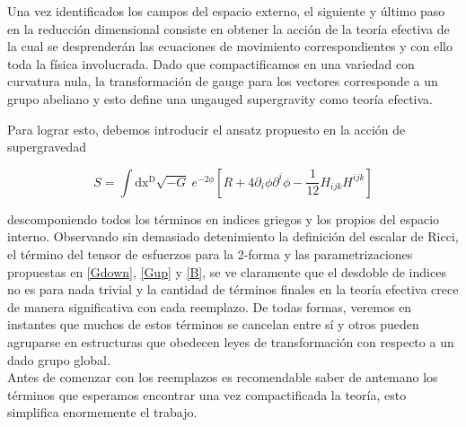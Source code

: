 \documentclass{article}
\numberwithin{equation}{section}
\begin{document}
Una vez identificados los campos del espacio externo, el siguiente y último paso en la reducción dimensional consiste en obtener la acción de la teoría efectiva de la cual se desprenderán las ecuaciones de movimiento correspondientes y con ello toda la física involucrada. Dado que compactificamos en una variedad con curvatura nula, la transformación de gauge para los vectores corresponde a un grupo abeliano y esto define una ungauged supergravity como teoría efectiva. 

Para lograr esto, debemos introducir el ansatz propuesto en la acción de supergravedad

\begin{equation}\label{S}
S=\int\mathrm{dx^D} \sqrt{-G} \ e^{-2\phi}\left[R + 4 \partial_i\phi\partial^i \phi - \frac{1}{12} H_{i j k}H^{i j k}\right]  
\end{equation}

descomponiendo todos los términos en indices griegos y los propios del espacio interno. Observando sin demasiado detenimiento la definición del escalar de Ricci, el término del tensor de esfuerzos para la 2-forma y las parametrizaciones propuestas en \ref{Gdown}, \ref{Gup} y \ref{B}, se ve claramente que el desdoble de indices no es para nada trivial y la cantidad de términos finales en la teoría efectiva crece de manera significativa con cada reemplazo. De todas formas, veremos en instantes que muchos de estos términos se cancelan entre sí y otros pueden agruparse en estructuras que obedecen leyes de transformación con respecto a un dado grupo global.\\ 
	
Antes de comenzar con los reemplazos es recomendable saber de antemano los términos que esperamos encontrar una vez compactificada la teoría, esto simplifica enormemente el trabajo.\\
\end{document}

